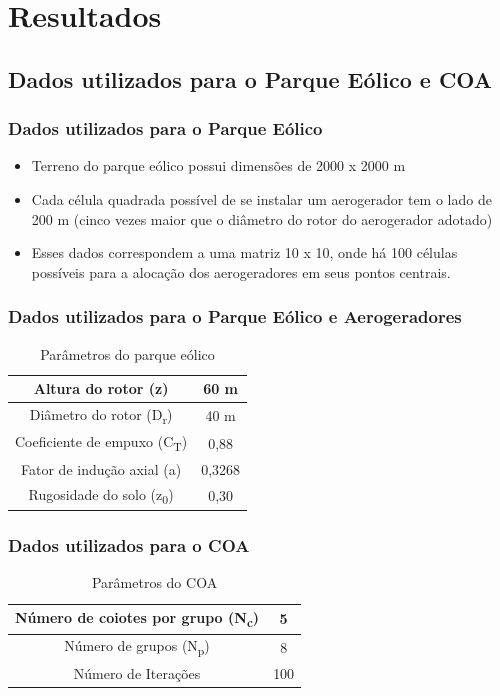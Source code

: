 \documentclass{beamer}
\begin{document}
	\section{Resultados}
	\subsection{Dados utilizados para o Parque Eólico e COA}
	\begin{frame}
		\frametitle{Dados utilizados para o Parque Eólico}
		\begin{itemize}
			\item Terreno do parque eólico possui dimensões de 2000 x 2000 m
			\item Cada célula quadrada possível de se instalar um aerogerador tem o lado de 200 m (cinco vezes maior que o diâmetro do rotor do aerogerador adotado)
			\item Esses dados correspondem a uma matriz 10 x 10, onde há 100 células possíveis para a alocação dos aerogeradores em seus pontos centrais. 
		\end{itemize}
	\end{frame}

	\begin{frame}
		\frametitle{Dados utilizados para o Parque Eólico e Aerogeradores}
		\begin{table}[H]
			\centering
			\begin{tabular}{|c|c|}
				\hline
				Altura do rotor (z) & 60 m \\
				\hline
				Diâmetro do rotor (D\textsubscript{r}) & 40 m \\
				\hline
				Coeficiente de empuxo (C\textsubscript{T}) & 0,88 \\
				\hline
				Fator de indução axial (a) & 0,3268 \\
				\hline
				Rugosidade do solo (z\textsubscript{0})& 0,30 \\
				\hline
			\end{tabular}
			\caption{Parâmetros do parque eólico}
			\label{tab:parqueeolico}	
		\end{table}
	\end{frame}

	\begin{frame}
		\frametitle{Dados utilizados para o COA}
		\begin{table}[H]
			\centering
			\begin{tabular}{|c|c|}
				\hline
				Número de coiotes por grupo (N\textsubscript{c}) & 5 \\
				\hline
				Número de grupos (N\textsubscript{p}) & 8 \\
				\hline
				Número de Iterações & 100 \\
				\hline
			\end{tabular}
			\caption{Parâmetros do COA}
			\label{tab:parametroscoa}
		\end{table}	
	\end{frame}
\end{document}
